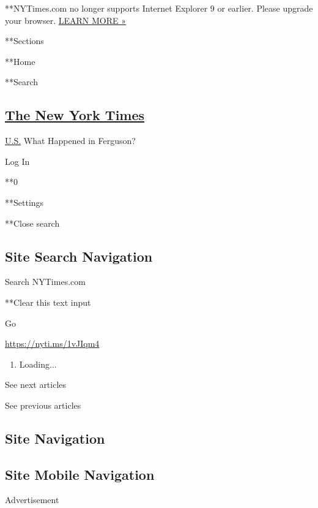  **NYTimes.com no longer supports Internet Explorer 9 or earlier. Please
upgrade your browser.
\href{http://www.nytimes.com/content/help/site/ie9-support.html}{LEARN
MORE »}

**Sections

**Home

**Search

\hypertarget{the-new-york-times}{%
\subsection{\texorpdfstring{\href{http://www.nytimes.com/}{The New York
Times}}{The New York Times}}\label{the-new-york-times}}

 \href{https://www.nytimes.com/section/us}{U.S.} \textbar{}What Happened
in Ferguson?

Log In

**0

**Settings

**Close search

\hypertarget{site-search-navigation}{%
\subsection{Site Search Navigation}\label{site-search-navigation}}

Search NYTimes.com

**Clear this text input

Go

\url{https://nyti.ms/1vJIqm4}

\begin{enumerate}
\def\labelenumi{\arabic{enumi}.}
\item
  Loading...
\end{enumerate}

See next articles

See previous articles

\hypertarget{site-navigation}{%
\subsection{Site Navigation}\label{site-navigation}}

\hypertarget{site-mobile-navigation}{%
\subsection{Site Mobile Navigation}\label{site-mobile-navigation}}

Advertisement

